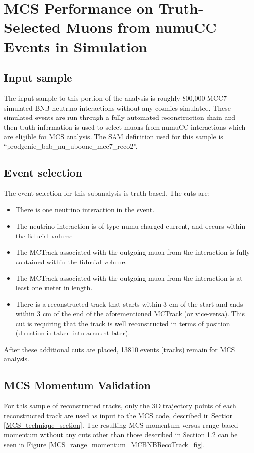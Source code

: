 \section{MCS Performance on Truth-Selected Muons from numuCC Events in Simulation}\label{MCBNBRecoTrack_performance_section}

\subsection{Input sample}\label{MCBNBRecoTrack_input_sample_section}
The input sample to this portion of the analysis is roughly 800,000 MCC7 simulated BNB neutrino interactions without any cosmics simulated. These simulated events are run through a fully automated reconstruction chain and then truth information is used to select muons from numuCC interactions which are eligible for MCS analysis. The SAM definition used for this sample is ``prodgenie\_bnb\_nu\_uboone\_mcc7\_reco2''.

\subsection{Event selection}\label{MCBNBRecoTrack_eventselection_section}
The event selection for this subanalysis is truth based. The cuts are:
\begin{itemize}
\item There is one neutrino interaction in the event.
\item The neutrino interaction is of type numu charged-current, and occurs within the fiducial volume.
\item The {\sc MCTrack} associated with the outgoing muon from the interaction is fully contained within the fiducial volume.
\item The {\sc MCTrack} associated with the outgoing muon from the interaction is at least one meter in length.
\item There is a reconstructed track that starts within 3 cm of the start and ends within 3 cm of the end of the aforementioned {\sc MCTrack} (or vice-versa). This cut is requiring that the track is well reconstructed in terms of position (direction is taken into account later).
\end{itemize}
After these additional cuts are placed, 13810 events (tracks) remain for MCS analysis.



\subsection{MCS Momentum Validation}\label{MCS_Momentum_Validation_MCBNBRecoTrack_section}
For this sample of reconstructed tracks, only the 3D trajectory points of each reconstructed track are used as input to the MCS code, described in Section \ref{MCS_technique_section}. The resulting MCS momentum versus range-based momentum without any cuts other than those described in Section \ref{MCBNBRecoTrack_eventselection_section} can be seen in Figure \ref{MCS_range_momentum_MCBNBRecoTrack_fig}. \\


